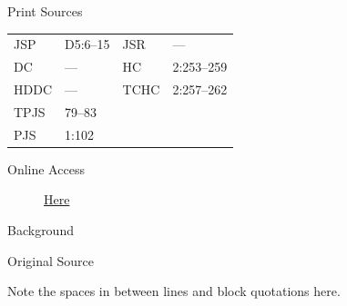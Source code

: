 			\begin{description}
				\item[Print Sources]
			\end{description}

				\begin{tabular}{p{0.5in}p{1in}p{0.5in}p{1in}}
				JSP	 	& D5:6--15		& JSR 		& --- \\
				DC	 	& --- 			& HC 		& 2:253--259 \\
				HDDC 	& ---			& TCHC 		& 2:257--262 \\
				TPJS 	& 79--83			& 	 		&  \\
				PJS 	& 1:102			& 	 		&  \\
				\end{tabular}
			
			\begin{description}
				\item[Online Access] \href{https://www.josephsmithpapers.org/paper-summary/letter-to-the-elders-of-the-church-2-october-1835/1}{Here}
			\end{description}
			
			\begin{description}
				\item[Background]
			\end{description}
			
			
			\begin{description}
				\item[Original Source]
			\end{description}
			
				
				Note the spaces in between lines and block quotations here.
			
